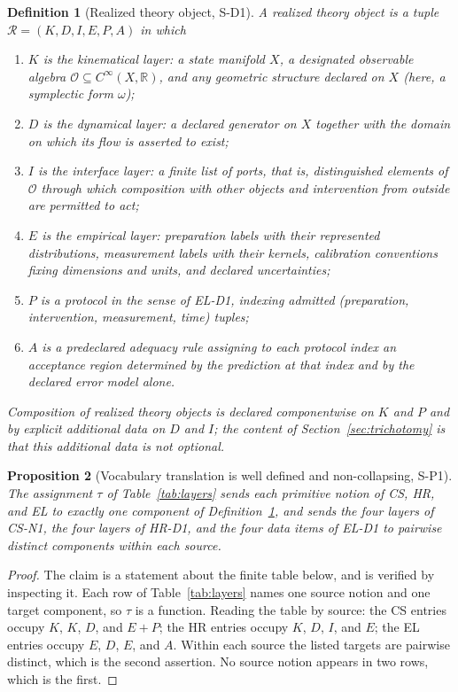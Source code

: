 \documentclass[11pt]{article}
\theoremstyle{plain}
\newtheorem{definition}{Definition}[section]
\newtheorem{proposition}[definition]{Proposition}
\newcommand{\R}{\mathbb{R}}
\begin{document}
\begin{definition}[Realized theory object, S-D1]
\label{def:object}
A \emph{realized theory object} is a tuple $\mathcal{R}=(K,D,I,E,P,A)$ in which
\begin{enumerate}[label=(\alph*),leftmargin=2.2em]
\item $K$ is the kinematical layer: a state manifold $X$, a designated
      observable algebra $\mathcal{O}\subseteq C^\infty(X,\R)$, and any
      geometric structure declared on $X$ (here, a symplectic form $\omega$);
\item $D$ is the dynamical layer: a declared generator on $X$ together with the
      domain on which its flow is asserted to exist;
\item $I$ is the interface layer: a finite list of \emph{ports}, that is,
      distinguished elements of $\mathcal{O}$ through which composition with
      other objects and intervention from outside are permitted to act;
\item $E$ is the empirical layer: preparation labels with their represented
      distributions, measurement labels with their kernels, calibration
      conventions fixing dimensions and units, and declared uncertainties;
\item $P$ is a protocol in the sense of EL-D1, indexing admitted
      (preparation, intervention, measurement, time) tuples;
\item $A$ is a predeclared adequacy rule assigning to each protocol index an
      acceptance region determined by the prediction at that index and by the
      declared error model alone.
\end{enumerate}
Composition of realized theory objects is declared componentwise on $K$ and $P$
and by explicit additional data on $D$ and $I$; the content of
Section~\ref{sec:trichotomy} is that this additional data is not optional.
\end{definition}

\begin{proposition}[Vocabulary translation is well defined and non-collapsing, S-P1]
\label{prop:translate}
The assignment $\tau$ of Table~\ref{tab:layers} sends each primitive notion of
CS, HR, and EL to exactly one component of Definition~\ref{def:object}, and
sends the four layers of CS-N1, the four layers of HR-D1, and the four data
items of EL-D1 to pairwise distinct components within each source.
\end{proposition}

\begin{proof}
The claim is a statement about the finite table below, and is verified by
inspecting it. Each row of Table~\ref{tab:layers} names one source notion and
one target component, so $\tau$ is a function. Reading the table by source: the
CS entries occupy $K$, $K$, $D$, and $E{+}P$; the HR entries occupy $K$, $D$,
$I$, and $E$; the EL entries occupy $E$, $D$, $E$, and $A$. Within each source
the listed targets are pairwise distinct, which is the second assertion. No
source notion appears in two rows, which is the first.
\end{proof}
\end{document}
